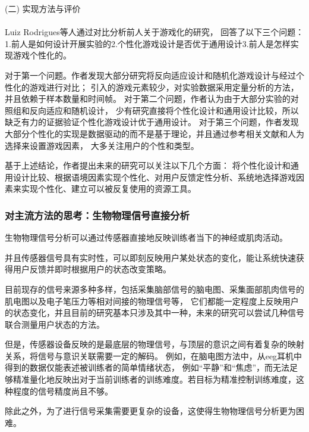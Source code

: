 \documentclass{article}
\begin{document}
            (二) 实现方法与评价\paragraph{}
            Luiz Rodrigues等人通过对比分析前人关于游戏化的研究，
            回答了以下三个问题：1.前人是如何设计开展实验的2.个性化游戏设计是否优于通用设计3.前人是怎样实现游戏个性化的。

            对于第一个问题。作者发现大部分研究将反向适应设计和随机化游戏设计与经过个性化的游戏进行对比；
            引入的游戏元素较少，对实验数据采用定量分析的方法，并且依赖于样本数量和时间帧。
            对于第二个问题，作者认为由于大部分实验的对照组和反向适应和随机设计，
            少有研究直接将个性化设计和通用设计比较，所以缺乏有力的证据验证个性化游戏设计优于通用设计。
            对于第三个问题，作者发现大部分个性化的实现是数据驱动的而不是基于理论，并且通过参考相关文献和人为选择来设置游戏因素，
            大多关注用户的个性和类型。

            基于上述结论，作者提出未来的研究可以关注以下几个方面：
            将个性化设计和通用设计比较、根据语境因素实现个性化、对用户反馈定性分析、系统地选择游戏因素来实现个性化、建立可以被反复使用的资源工具。

            \subsubsection{对主流方法的思考：生物物理信号直接分析}
            生物物理信号分析可以通过传感器直接地反映训练者当下的神经或肌肉活动。

            并且传感器信号具有实时性，可以即刻反映用户某处状态的变化，能让系统快速获得用户反馈并即时根据用户的状态改变策略。

            目前现存的信号来源多种多样，包括采集脑部信号的脑电图、采集面部肌肉信号的肌电图以及电子笔压力等相对间接的物理信号等，
            它们都能一定程度上反映用户的状态变化，并且目前的研究基本只涉及其中一种，未来的研究可以尝试几种信号联合测量用户状态的方法。

            但是，传感器设备反映的是最底层的物理信号，与顶层的意识之间有着复杂的映射关系，将信号与意识关联需要一定的解码。
            例如，在脑电图方法中，从eeg耳机中得到的数据仅能表述被训练者的简单情绪状态，
            例如“平静”和“焦虑”，而无法足够精准量化地反映出对于当前训练者的训练难度。若目标为精准控制训练难度，这种程度的信号精度尚且不够。

            除此之外，为了进行信号采集需要更复杂的设备，这使得生物物理信号分析更为困难。
\end{document}
